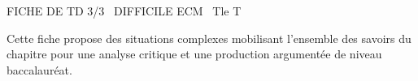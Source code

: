 \documentclass[11pt]{article}
\begin{document}
\begin{tcolorbox}[enhanced,colback=popink,colframe=popink,arc=10pt,boxrule=0pt,left=12pt,right=12pt,top=9pt,bottom=9pt]
{\color{white}\popxbold\small FICHE DE TD 3/3 \textbullet\ DIFFICILE \hfill ECM \textbullet\ Tle T\par}
\end{tcolorbox}
\vspace{4pt}
Cette fiche propose des situations complexes mobilisant l'ensemble des savoirs du chapitre pour une analyse critique et une production argumentée de niveau baccalauréat.
\end{document}
